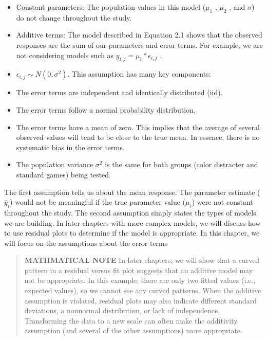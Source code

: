 \documentclass[
]{book}
\providecommand{\tightlist}{%
  \setlength{\itemsep}{0pt}\setlength{\parskip}{0pt}}
\begin{document}
\begin{itemize}
\tightlist
\item
  Constant parameters: The population values in this model (\(\mu_1\) , \(\mu_2\) , and \(\sigma\)) do not change throughout the study.
\item
  Additive terms: The model described in Equation 2.1 shows that the observed responses are the sum of our parameters and error terms. For example, we are not considering models such as
  \(y_{i, j} = \mu_i * \epsilon_{i, j}\) .
\item
  \(\epsilon_{i, j} \sim N(0,\sigma^2)\). This assumption has many key components:
\item
  The error terms are independent and identically distributed (iid).
\item
  The error terms follow a normal probability distribution.
\item
  The error terms have a mean of zero. This implies that the average of several observed values will tend to be close to the true mean. In essence, there is no systematic bias in the error terms.
\item
  The population variance \(\sigma^2\) is the same for both groups (color distracter and standard games) being tested.
\end{itemize}

The first assumption tells us about the mean response. The parameter estimate (\(\bar{y}_i\)) would not be meaningful if the true parameter value (\(\mu_i\)) were not constant throughout the study. The second assumption simply states the types of models we are building. In later chapters with more complex models, we will discuss how to use residual plots to determine if the model is appropriate. In this chapter, we will focus on the assumptions about the error terms

\begin{quote}
\textbf{MATHMATICAL NOTE}
In later chapters, we will show that a curved pattern in a residual versus fit plot suggests that an additive model may not be appropriate. In this example, there are only two fitted values (i.e., expected values), so we cannot see any curved patterns. When the additive assumption is violated, residual plots may also indicate different standard deviations, a nonnormal distribution, or lack of independence. Transforming the data to a new scale can often make the additivity assumption (and several of the other assumptions) more appropriate.
\end{quote}
\end{document}
